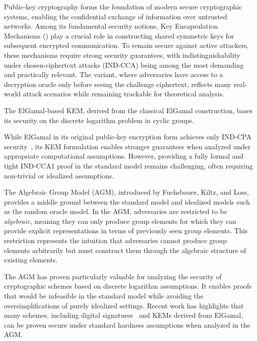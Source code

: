 Public-key cryptography forms the foundation of modern secure cryptographic systems, enabling the confidential exchange of information over untrusted networks. Among its fundamental security notions, Key Encapsulation Mechanisms (\KEM) play a crucial role in constructing shared symmetric keys for subsequent encrypted communication\cite{Sharifian2021}. 
To remain secure against active attackers, these mechanisms require strong security guarantees, with indistinguishability under chosen-ciphertext attacks (IND-CCA) being among the most demanding and practically relevant.
The \INDCCAone variant, where adversaries have access to a decryption oracle only before seeing the challenge ciphertext, reflects many real-world attack scenarios while remaining trackable for theoretical analysis.



The ElGamal-based KEM, derived from the classical ElGamal construction, bases its security on the discrete logarithm problem in cyclic groups\cite{Sven2024}.

While ElGamal in its original public-key encryption form achieves only IND-CPA security~\cite{pandey2021}, its KEM formulation enables stronger guarantees when analyzed under appropriate computational assumptions\cite{Sven2024}. 
However, providing a fully formal and tight IND-CCA1 proof in the standard model remains challenging, often requiring non-trivial or idealized assumptions.

The Algebraic Group Model (AGM), introduced by Fuchsbauer, Kiltz, and Loss\cite{fuchsbauer2018}, provides a middle ground between the standard model and idealized models such as the random oracle model. 
In the AGM, adversaries are restricted to be \emph{algebraic}, meaning they can only produce group elements for which they can provide explicit representations in terms of previously seen group elements. This restriction represents the intuition that adversaries cannot produce group elements arbitrarily but must construct them through the algebraic structure of existing elements.

The AGM has proven particularly valuable for analyzing the security of cryptographic schemes based on discrete logarithm assumptions. It enables proofs that would be infeasible in the standard model while avoiding the oversimplifications of purely idealized settings\cite{Bauer2021}. Recent work has highlights that many schemes, including digital signatures~\cite{fersch2018} and KEMs derived from ElGamal, can be proven secure under standard hardness assumptions when analyzed in the AGM.



